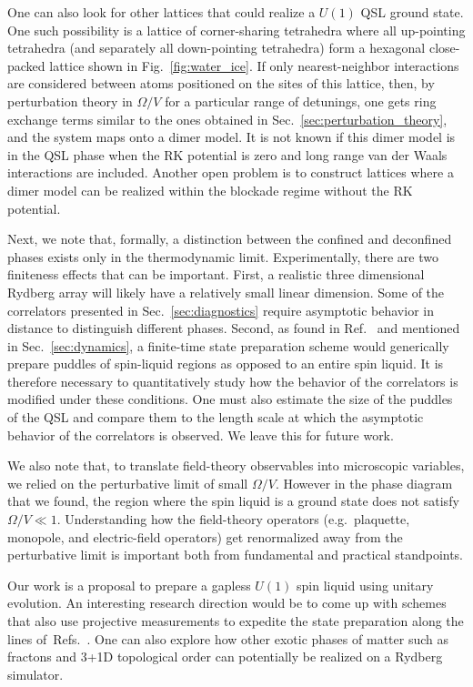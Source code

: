 \documentclass[twocolumn,superscriptaddress,amsmath,amssymb,aps,prx,nofootinbib]{revtex4-2}
\begin{document}
One can also look for other lattices that could realize a $U(1)$ QSL ground state. One such possibility is a lattice of corner-sharing tetrahedra where all up-pointing tetrahedra (and separately all down-pointing tetrahedra) form a hexagonal close-packed lattice shown in Fig.~\ref{fig:water_ice}. If only nearest-neighbor interactions are considered between atoms positioned on the sites of this lattice, then, by perturbation theory in $\Omega/V$ for a particular range of detunings, one gets ring exchange terms similar to the ones obtained in Sec.~\ref{sec:perturbation_theory}, and the system maps onto a dimer model. It is not known if this dimer model is in the QSL phase when the RK potential is zero and long range van der Waals interactions are included. Another open problem is to construct lattices where a dimer model can be realized within the blockade regime without the RK potential.

Next, we note that, formally, a distinction between the confined and deconfined phases exists only in the thermodynamic limit. Experimentally, there are two finiteness effects that can be important. First, a realistic three dimensional Rydberg array will likely have a relatively small linear dimension.  
Some of the correlators presented in Sec.~\ref{sec:diagnostics} require asymptotic behavior in distance to distinguish different phases. Second, as found in Ref.~\cite{sahay2022quantum} and mentioned in Sec.~\ref{sec:dynamics}, a finite-time state preparation scheme would generically prepare puddles of spin-liquid regions as opposed to an entire spin liquid. It is therefore necessary to quantitatively study how the behavior of the correlators is modified under these conditions. One must also estimate the size of the puddles of the QSL and compare them to the length scale at which the asymptotic behavior of the correlators is observed. We leave this for future work.

We also note that, to translate field-theory observables into microscopic variables, we relied on the perturbative limit of small $\Omega/V$. However in the phase diagram that we found, the region where the spin liquid is a ground state does not satisfy $\Omega/V\ll1$. Understanding how the field-theory operators (e.g.~plaquette, monopole, and electric-field operators) get renormalized away from the perturbative limit is important both from fundamental and practical standpoints.

Our work is a proposal to prepare a gapless $U(1)$ spin liquid using unitary evolution. An interesting research direction would be to come up with schemes that also use projective measurements to expedite the state preparation along the lines of~Refs.~\cite{tantivasadakarn2022shortest,lavasani2022monitored}. One can also explore how other exotic phases of matter such as fractons and 3+1D topological order can potentially be realized on a Rydberg simulator.
\end{document}
